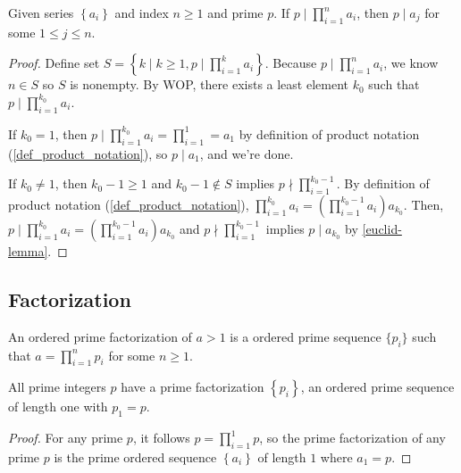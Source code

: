 \begin{theorem}\label{extended-euclid}
    Given series $\left\{a_i\right\}$ and index $n\geq 1$ and prime $p$. If $p\mid \prod_{i=1}^n a_i$, then $p\mid a_j$ for some $1\leq j\leq n$. 
\end{theorem}
\begin{proof}
    Define set $S=\left\{k \mid k\geq1, p\mid \prod_{i=1}^k a_i \right\}$. Because $p\mid \prod_{i=1}^n a_i$, we know $n\in S$ so $S$ is nonempty. By WOP, there exists a least element $k_0$ such that $p\mid \prod_{i=1}^{k_0} a_i$. 
    
    If $k_0=1$, then $p\mid\prod_{i=1}^{k_0} a_i=\prod_{i=1}^1=a_1$ by definition of product notation (\ref{def_product_notation}), so $p\mid a_1$, and we're done. 

    If $k_0\neq 1$, then $k_0-1\geq1$ and $k_0-1\notin S$ implies $p\nmid \prod_{i=1}^{k_0-1}$. By definition of product notation (\ref{def_product_notation}), $\prod_{i=1}^{k_0} a_i=(\prod_{i=1}^{k_0-1} a_i) a_{k_0}$. Then, $p\mid \prod_{i=1}^{k_0} a_i=(\prod_{i=1}^{k_0-1} a_i) a_{k_0}$ and $p\nmid \prod_{i=1}^{k_0-1}$ implies $p\mid a_{k_0}$ by \ref{euclid-lemma}.
\end{proof}

\subsection{Factorization}

\begin{definition}
    An ordered prime factorization of $a>1$ is a ordered prime sequence $\{ p_i \}$ such that $a=\prod_{i=1}^n p_i$ for some $n\geq 1$.
\end{definition}

\begin{lemma}\label{prime_factorization_exist_prime}
    All prime integers $p$ have a prime factorization $\left\{p_i\right\}$, an ordered prime sequence of length one with $p_1=p$.
\end{lemma}
\begin{proof}
    For any prime $p$, it follows $p=\prod_{i=1}^1 p$, so the prime factorization of any prime $p$ is the prime ordered sequence $\left\{a_i\right\}$ of length $1$ where $a_1=p$.
\end{proof}

